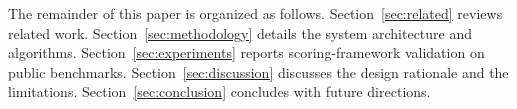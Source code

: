 The remainder of this paper is organized as follows. Section~\ref{sec:related} reviews related work. Section~\ref{sec:methodology} details the system architecture and algorithms. Section~\ref{sec:experiments} reports scoring-framework validation on public benchmarks. Section~\ref{sec:discussion} discusses the design rationale and the limitations. Section~\ref{sec:conclusion} concludes with future directions.
